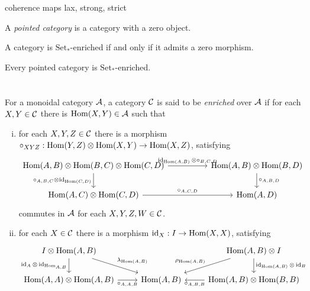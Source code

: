 \documentclass{../../large}
\begin{document}
\begin{prb}
\end{prb}

\begin{prb}
coherence maps
lax, strong, strict
\end{prb}





\begin{prb}
A \emph{pointed category} is a category with a zero object.
\begin{parts}
\item A category is $\mathrm{Set}_*$-enriched if and only if it admits a zero morphism.
\item Every pointed category is $\mathrm{Set}_*$-enriched.
\end{parts}
\end{prb}



\section{}

\begin{prb}
For a monoidal category $\mathcal{A}$, a category $\mathcal{C}$ is said to be \emph{enriched} over $\mathcal{A}$ if for each $X,Y\in\mathcal{C}$ there is $\operatorname{Hom}(X,Y)\in\mathcal{A}$ such that
\begin{enumerate}[(i)]
\item for each $X,Y,Z\in\mathcal{C}$ there is a morphism $\circ_{XYZ}:\operatorname{Hom}(Y,Z)\otimes\operatorname{Hom}(X,Y)\to\operatorname{Hom}(X,Z)$, satisfying
\[\begin{tikzcd}[column sep=huge]
\Hom(A,B)\otimes\Hom(B,C)\otimes\Hom(C,D) \rar{\id_{\Hom(A,B)}\otimes\circ_{B,C,D}} \dar[swap]{\circ_{A,B,C}\otimes\id_{\Hom(C,D)}} &
\Hom(A,B)\otimes\Hom(B,D) \dar{\circ_{A,B,D}} \\
\Hom(A,C)\otimes\Hom(C,D) \rar{\circ_{A,C,D}} &
\Hom(A,D)
\end{tikzcd}\]
commutes in $\mathcal{A}$ for each $X,Y,Z,W\in\mathcal{C}$.
\item for each $X\in\mathcal{C}$ there is a morphism $\operatorname{id}_X:I\to\operatorname{Hom}(X,X)$, satisfying
\[\begin{tikzcd}
I\otimes\Hom(A,B) \dar[swap]{\id_A\otimes\id_{\Hom_{A,B}}} \ar{dr}{\lambda_{\Hom(A,B)}} &&
\Hom(A,B)\otimes I \ar[swap]{dl}{\rho_{\Hom(A,B)}} \dar{\id_{\Hom(A,B)}\otimes\id_B}\\
\Hom(A,A)\otimes\Hom(A,B) \rar[swap]{\circ_{A,A,B}} &
\Hom(A,B)  &
\Hom(A,B)\otimes\Hom(B,B) \lar{\circ_{A,B,B}}
\end{tikzcd}\]
\end{enumerate}
\end{prb}
\end{document}
